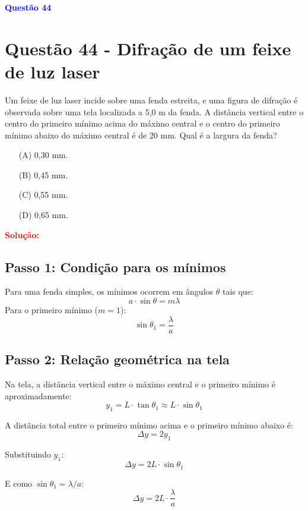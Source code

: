 \documentclass[a4paper,12pt]{article}
\begin{document}
\begin{flushleft}
\textbf{\textcolor{blue}{\Large Quest\~ao 44}}\\
\noindent
\section{Quest\~ao 44 - Difração de um feixe de luz laser}
Um feixe de luz laser incide sobre uma fenda estreita, e uma
figura de difração é observada sobre uma tela localizada a 5,0 m
da fenda. A distância vertical entre o centro do primeiro mínimo
acima do máximo central e o centro do primeiro mínimo abaixo
do máximo central é de 20 mm. Qual é a largura da fenda?

\begin{itemize}
\item[(A)] 0,30 mm.
\item[(B)] 0,45 mm.
\item[(C)] 0,55 mm.
\item[(D)] 0,65 mm.
\end{itemize}

\vspace{0.5cm}

\textcolor{red}{\textbf{Solução:}}\\

\subsection*{Passo 1: Condição para os mínimos}

Para uma fenda simples, os mínimos ocorrem em ângulos \(\theta\) tais que:
\[
a \cdot \sin\theta = m\lambda
\]
Para o primeiro mínimo (\(m=1\)):
\[
\sin\theta_1 = \frac{\lambda}{a}
\]

\vspace{0.5cm}

\subsection*{Passo 2: Relação geométrica na tela}

Na tela, a distância vertical entre o máximo central e o primeiro mínimo é aproximadamente:
\[
y_1 = L \cdot \tan\theta_1 \approx L \cdot \sin\theta_1
\]

A distância total entre o primeiro mínimo acima e o primeiro mínimo abaixo é:
\[
\Delta y = 2y_1
\]

Substituindo \(y_1\):
\[
\Delta y = 2L \cdot \sin\theta_1
\]

E como \(\sin\theta_1 = \lambda/a\):
\[
\Delta y = 2L \cdot \frac{\lambda}{a}
\]


\end{flushleft}
\end{document}
